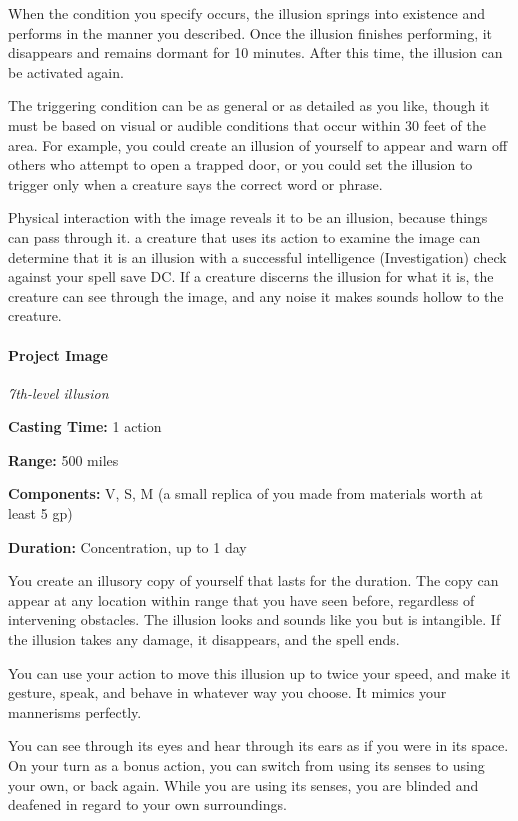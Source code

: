 \documentclass[
]{article}
\begin{document}
When the condition you specify occurs, the illusion springs into
existence and performs in the manner you described. Once the illusion
finishes performing, it disappears and remains dormant for 10 minutes.
After this time, the illusion can be activated again.

The triggering condition can be as general or as detailed as you like,
though it must be based on visual or audible conditions that occur
within 30 feet of the area. For example, you could create an illusion of
yourself to appear and warn off others who attempt to open a trapped
door, or you could set the illusion to trigger only when a creature says
the correct word or phrase.

Physical interaction with the image reveals it to be an illusion,
because things can pass through it. a creature that uses its action to
examine the image can determine that it is an illusion with a successful
intelligence (Investigation) check against your spell save DC. If a
creature discerns the illusion for what it is, the creature can see
through the image, and any noise it makes sounds hollow to the creature.

\hypertarget{project-image}{%
\paragraph{Project Image}\label{project-image}}

\emph{7th-level illusion}

\textbf{Casting Time:} 1 action

\textbf{Range:} 500 miles

\textbf{Components:} V, S, M (a small replica of you made from materials
worth at least 5 gp)

\textbf{Duration:} Concentration, up to 1 day

You create an illusory copy of yourself that lasts for the duration. The
copy can appear at any location within range that you have seen before,
regardless of intervening obstacles. The illusion looks and sounds like
you but is intangible. If the illusion takes any damage, it disappears,
and the spell ends.

You can use your action to move this illusion up to twice your speed,
and make it gesture, speak, and behave in whatever way you choose. It
mimics your mannerisms perfectly.

You can see through its eyes and hear through its ears as if you were in
its space. On your turn as a bonus action, you can switch from using its
senses to using your own, or back again. While you are using its senses,
you are blinded and deafened in regard to your own surroundings.
\end{document}
